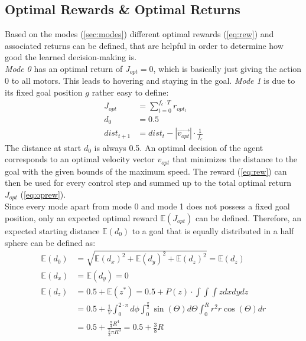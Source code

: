 \subsection{Optimal Rewards \& Optimal Returns}\label{sec:oprew}
Based on the modes (\cref{sec:modes}) different optimal rewards (\cref{eq:rew}) and associated returns can be defined, 
that are helpful in order to determine how good the learned decision-making is.\\
\emph{Mode 0} has an optimal return of $J_{opt} = 0$, which is basically just giving the action $0$ to all motors. 
This leads to hovering and staying in the goal.
\emph{Mode 1} is due to its fixed goal position $g$ rather easy to define:
\begin{align}
J_{opt} &= \sum_{t=0}^{f_c \cdot T}  r_{opt_t} \label{eq:oprew}\\
d_0 &= 0.5\\
dist_{t+1} &= dist_t - |\overrightarrow{v_{opt}}| \cdot \frac{1}{f_c} \label{eq:dt1}%
\end{align}
The distance at start $d_0$ is always 0.5. An optimal decision of the agent corresponds to an optimal velocity vector $v_{opt}$ that minimizes 
the distance to the goal with the given bounds of the maximum speed. 
The reward (\cref{eq:rew}) can then be used for every control step and summed up to the total optimal return $J_{opt}$ (\cref{eq:oprew}).\\
Since every mode apart from mode 0 and mode 1 does not possess a fixed goal position, only an expected optimal reward $\mathbb{E}(J_{opt})$ can be defined. 
Therefore, an expected starting distance $\mathbb{E}(d_0)$ to a goal that is equally distributed in a half sphere can be defined as:
\begin{align}
	\mathbb{E}(d_0) &= \sqrt{\mathbb{E}(d_x)^2 + \mathbb{E}(d_y)^2 + \mathbb{E}(d_z)^2}  = \mathbb{E}(d_z) \\
	\mathbb{E}(d_x) &= \mathbb{E}(d_y) = 0\\
	\mathbb{E}(d_z) &= 0.5 + \mathbb{E}(z^*) = 0.5 + P(z) \cdot \int \int \int  z dx dy dz \nonumber \\
	&= 0.5 + \frac{1}{V} \int_{0}^{2 \cdot \pi} d \phi \int_{0}^{\frac{\pi}{2}} \sin(\Theta) d\Theta \int_{0}^{R} r^2 r \cos(\Theta)  dr  \nonumber \\
	&= 0.5 + \frac{\frac{\pi}{4} R^4}{\frac{2}{3} \pi R^3} = 0.5 + \frac{3}{8} R \label{eq:expected}
\end{align}
